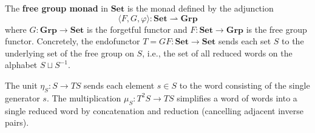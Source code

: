 The \textbf{free group monad} in $\mathbf{Set}$ is the monad defined by the adjunction
$$\langle F, G, \varphi \rangle : \mathbf{Set} \rightharpoonup \mathbf{Grp}$$
where $G: \mathbf{Grp} \to \mathbf{Set}$ is the forgetful functor and
$F: \mathbf{Set} \to \mathbf{Grp}$ is the free group functor.
Concretely, the endofunctor $T = GF: \mathbf{Set} \to \mathbf{Set}$ sends each set $S$
to the underlying set of the free group on $S$, i.e., the set of all reduced words
on the alphabet $S \sqcup S^{-1}$.

The unit $\eta_S: S \to T S$ sends each element $s \in S$ to the word consisting
of the single generator $s$. The multiplication $\mu_S: T^2 S \to T S$ simplifies
a word of words into a single reduced word by concatenation and reduction
(cancelling adjacent inverse pairs).

